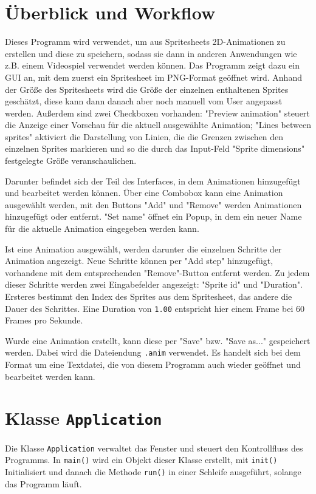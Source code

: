 \chapter{Überblick und Workflow}
Dieses Programm wird verwendet, um aus Spritesheets 2D-Animationen zu erstellen und diese zu speichern, sodass sie dann in anderen Anwendungen wie z.B. einem Videospiel verwendet werden können. Das Programm zeigt dazu ein GUI an, mit dem zuerst ein Spritesheet im PNG-Format geöffnet wird. Anhand der Größe des Spritesheets wird die Größe der einzelnen enthaltenen Sprites geschätzt, diese kann dann danach aber noch manuell vom User angepasst werden. Außerdem sind zwei Checkboxen vorhanden: "Preview animation" steuert die Anzeige einer Vorschau für die aktuell ausgewählte Animation; "Lines between sprites" aktiviert die Darstellung von Linien, die die Grenzen zwischen den einzelnen Sprites markieren und so die durch das Input-Feld "Sprite dimensions" festgelegte Größe veranschaulichen.

Darunter befindet sich der Teil des Interfaces, in dem Animationen hinzugefügt und bearbeitet werden können. Über eine Combobox kann eine Animation ausgewählt werden, mit den Buttons "Add" und "Remove" werden Animationen hinzugefügt oder entfernt. "Set name" öffnet ein Popup, in dem ein neuer Name für die aktuelle Animation eingegeben werden kann.

Ist eine Animation ausgewählt, werden darunter die einzelnen Schritte der Animation angezeigt. Neue Schritte können per "Add step" hinzugefügt, vorhandene mit dem entsprechenden "Remove"-Button entfernt werden. Zu jedem dieser Schritte werden zwei Eingabefelder angezeigt: "Sprite id" und "Duration". Ersteres bestimmt den Index des Sprites aus dem Spritesheet, das andere die Dauer des Schrittes. Eine Duration von \lstinline{1.00} entspricht hier einem Frame bei 60 Frames pro Sekunde.

Wurde eine Animation erstellt, kann diese per "Save" bzw. "Save as..." gespeichert werden. Dabei wird die Dateiendung \lstinline{.anim} verwendet. Es handelt sich bei dem Format um eine Textdatei, die von diesem Programm auch wieder geöffnet und bearbeitet werden kann.

\chapter{Klasse \lstinline{Application}}
Die Klasse \lstinline{Application} verwaltet das Fenster und steuert den Kontrollfluss des Programms. In \lstinline{main()} wird ein Objekt dieser Klasse erstellt, mit \lstinline{init()} Initialisiert und danach die Methode \lstinline{run()} in einer Schleife ausgeführt, solange das Programm läuft.

